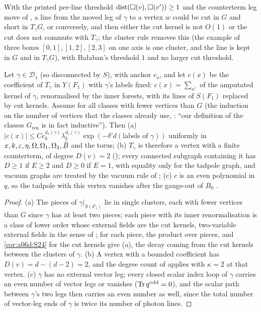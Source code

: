 With the printed per-line threshold $\operatorname{dist}(\square(v),\square(v'))\ge1$ and the counterterm leg move of \cite[p.~417]{Ba3}, a line from the moved leg of $\gamma$ to a vertex $w$ could be cut in $G$ and short in $T_\gamma G$, or conversely, and then either the cut kernel is not $O(1)$ or the cut does not commute with $T_\gamma$; the cluster rule removes this (the example of three boxes $[0,1],[1,2],[2,3]$ on one axis is one cluster, and the line is kept in $G$ and in $T_\gamma G$), with Ba{\l}aban's threshold $1$ and no larger cut threshold.

\begin{lemma}\label{lem:a06d:S25}
Let $\gamma\in\mathcal D_1$ (so disconnected by $S$), with anchor $v_a$, and let $c(x)$ be the coefficient of $T_\gamma$ in $Y(F_1)$ with $\gamma$'s labels fixed: $c(x)=\sum_{x'}$ of the amputated kernel of $\gamma$, renormalised by the inner forests, with its lines of $S(F_1)$ replaced by cut kernels. Assume \cite[(1.33)]{Ba3} for all classes with fewer vertices than $G$ (the induction on the number of vertices that the classes already use, \cite[p.~431]{Ba3}: ``our definition of the classes $G_{\mathrm{ren}}$ is in fact inductive''). Then \textup{(a)} $|c(x)|\le Ce_k^{d_v(\gamma)}\lambda_k^{d_s(\gamma)}\exp(-\delta'd(\text{labels of }\gamma))$ uniformly in $x,k,\varepsilon,\eta,\Omega,\Omega_1,\Omega_2,\tilde B$ and the torus; \textup{(b)} $T_\gamma$ is therefore a \cite[(1.7)]{Ba3} vertex with a finite counterterm, of degree $D(v)=2$ (\cite[p.~423 (ii)]{Ba3}); every connected subgraph containing it has $D\ge1$ if $E\ge2$ and $D\ge0$ if $E=1$, with equality only for the tadpole graph, and vacuum graphs are treated by the vacuum rule of \cite[p.~432]{Ba3}; \textup{(c)} $c$ is an even polynomial in $q$, so the tadpole with this vertex vanishes after the gauge-out of $B_0$ \cite[p.~433]{Ba3}.
\end{lemma}

\begin{proof}
(a) The pieces of $\gamma|_{S(F_1)}$ lie in single clusters, each with fewer vertices than $G$ since $\gamma$ has at least two pieces; each piece with its inner renormalisation is a class of lower order whose external fields are the cut kernels, two-variable external fields in the sense of \cite[p.~419]{Ba3}; \cite[(1.33)]{Ba3} for each piece, the product over pieces, and \cref{cor:a06d:S24} for the cut kernels give (a), the decay coming from the cut kernels between the clusters of $\gamma$. (b) A \cite[(1.7)]{Ba3} vertex with a bounded coefficient has $D(v)=d-(d-2)=2$, and the degree count of \cite[(2.1)--(2.3)]{Ba3} applies with $\kappa=2$ at that vertex. (c) $\gamma$ has no external vector leg; every closed scalar index loop of $\gamma$ carries an even number of vector legs or vanishes ($\operatorname{Tr} q^{\mathrm{odd}}=0$), and the scalar path between $\gamma$'s two legs then carries an even number as well, since the total number of vector-leg ends of $\gamma$ is twice its number of photon lines.
\end{proof}

